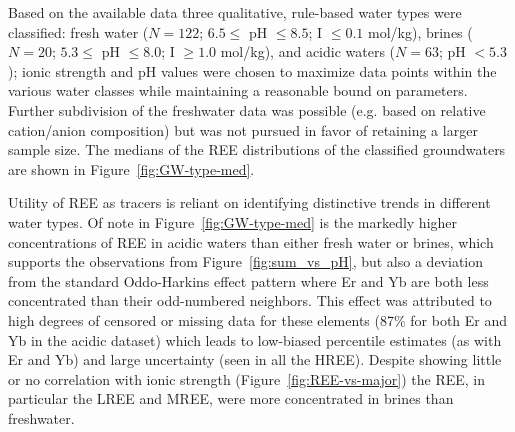 Based on the available data three qualitative, rule-based water types were classified: fresh water ($N=122$; $6.5\leq$ pH $\leq8.5$; I $\leq0.1$ mol/kg), brines ($N=20$; $5.3\leq$ pH $\leq8.0$; I $\geq1.0$ mol/kg), and acidic waters ($N=63$; pH $<5.3$);
ionic strength and pH values were chosen to maximize data points within the various water classes while maintaining a reasonable bound on parameters.
Further subdivision of the freshwater data was possible (e.g. based on relative cation/anion composition) but was not pursued in favor of retaining a larger sample size.
The medians of the REE distributions of the classified groundwaters are shown in Figure~\ref{fig:GW-type-med}.

Utility of REE as tracers is reliant on identifying distinctive trends in different water types.
Of note in Figure~\ref{fig:GW-type-med} is the markedly higher concentrations of REE in acidic waters than either fresh water or brines, which supports the observations from Figure~\ref{fig:sum_vs_pH}, but also a deviation from the standard Oddo-Harkins effect pattern where Er and Yb are both less concentrated than their odd-numbered neighbors.
This effect was attributed to high degrees of censored or missing data for these elements (87\% for both Er and Yb in the acidic dataset) which leads to low-biased percentile estimates (as with Er and Yb) and large uncertainty (seen in all the HREE).
Despite showing little or no correlation with ionic strength (Figure~\ref{fig:REE-vs-major}) the REE, in particular the LREE and MREE, were more concentrated in brines than freshwater.

